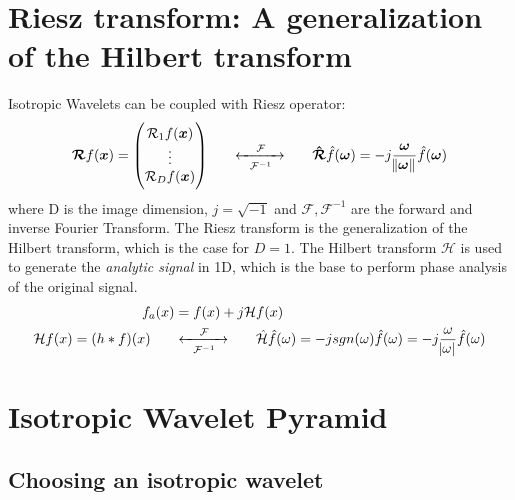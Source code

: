 \documentclass{InsightArticle}
\begin{document}
\section{Riesz transform: A generalization of the Hilbert transform}
\label{sec:Riesz}

Isotropic Wavelets can be coupled with Riesz operator:
\begin{equation}
\bm{\mathcal{R}} f(\bm{x}) =
  \begin{pmatrix}
    \mathcal{R}_{1} f(\bm{x}) \\
    \vdots \\
    \mathcal{R}_D f(\bm{x})
  \end{pmatrix}
  \hspace{0.6cm}
  \xleftrightarrow[\mathcal{F}^{-1}]{\hspace{0.4cm}\mathcal{F}\hspace{0.4cm}}
  \hspace{0.6cm}
  \bm{\hat{\mathcal{R}}}\hat{f}(\bm{\omega}) = -j \frac{\bm{\omega}}{\norm{\bm{\omega}}}\hat{f}(\bm{\omega})
\end{equation}
where D is the image dimension, $j=\sqrt{-1}$ and $\mathcal{F}, \mathcal{F}^{-1}$ are the forward and inverse Fourier Transform.
The Riesz transform is the generalization of the Hilbert transform, which is the case for $D=1$. The Hilbert transform $\mathcal{H}$ is used to generate the \textit{analytic signal} in 1D, which is the base to perform phase analysis of the original signal.
\begin{equation}
\label{eq:analytic-signal}
\begin{aligned}
  f_a(x) &= f(x) + j \mathcal{H}f(x) \\
  \mathcal{H}f(x) = (h * f)(x)
  \hspace{0.6cm}
  &\xleftrightarrow[\mathcal{F}^{-1}]{\hspace{0.4cm}\mathcal{F}\hspace{0.4cm}}
  \hspace{0.6cm}
  \hat{\mathcal{H}}\hat{f}(\omega) = -jsgn(\omega)\hat{f}(\omega) = -j \frac{\omega}{\abs{\omega}}\hat{f}(\omega)
\end{aligned}
\end{equation}

\section{Isotropic Wavelet Pyramid}
\label{sec:Pyramid}

\subsection{Choosing an isotropic wavelet}
\label{sub:Choosing}
\end{document}
